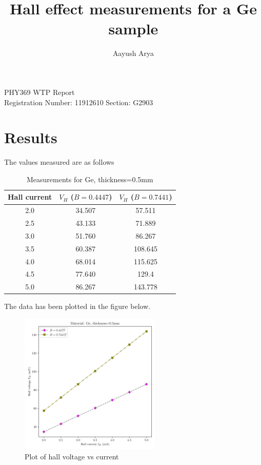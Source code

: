 \documentclass[11pt, a4paper]{article}
\begin{document}
	\author{Aayush Arya}
	\title{Hall effect measurements for a Ge sample}
	\maketitle
	
	\hline
	\begin{center}
		PHY369 WTP Report\\
		Registration Number: 11912610 \quad Section: G2903
	\end{center}
	\hline
	
	\section*{Results}
	The values measured are as follows
	
	\begin{table}[h]
		\centering
		\begin{tabular}{|c|c|c|}
			\hline
			Hall current & $V_H$ ($B=0.4447$) & $V_H$ ($B=0.7441 $)\\
			\hline
			2.0 & 34.507 & 57.511\\
			2.5 & 43.133 & 71.889\\
			3.0 & 51.760 & 86.267 \\
			3.5 & 60.387 & 108.645\\
			4.0 & 68.014 & 115.625\\
			4.5 & 77.640 & 129.4 \\
			5.0 & 86.267 & 143.778\\
			\hline
		\end{tabular}
		\caption{Measurements for Ge, thickness=0.5mm}
	\end{table}

The data has been plotted in the figure below.
	
	\begin{figure}[!h]
		\centering
		\includegraphics[width=0.6\textwidth]{../hall_effect}
		\caption{Plot of hall voltage vs current}
	\end{figure}
	
\end{document}
